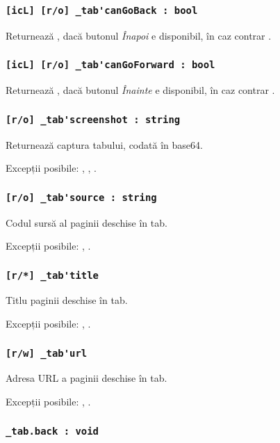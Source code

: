 \subsubsection{\lstinline|[icL] [r/o] _tab'canGoBack : bool|}

Returnează \true, dacă butonul \textit{Înapoi} e disponibil, în caz contrar \false.

\subsubsection{\lstinline|[icL] [r/o] _tab'canGoForward : bool|}

Returnează \true, dacă butonul \textit{Înainte} e disponibil, în caz contrar \false.

\subsubsection{\lstinline|[r/o] _tab'screenshot : string|}

Returnează captura tabului, codată în base64.

Excepții posibile: , , .

\subsubsection{\lstinline|[r/o] _tab'source : string|}

Codul sursă al paginii deschise în tab.

Excepții posibile: , .

\subsubsection{\lstinline|[r/*] _tab'title|}

Titlu paginii deschise în tab.

Excepții posibile: , .

\subsubsection{\lstinline|[r/w] _tab'url|}

Adresa URL a paginii deschise în tab.

Excepții posibile: , .

\subsubsection{\lstinline|_tab.back : void|}

